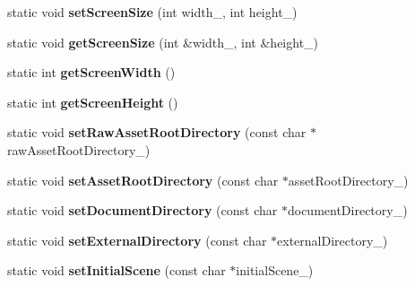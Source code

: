 \begin{DoxyCompactItemize}
\item 
static void {\bfseries set\+Screen\+Size} (int width\+\_\+, int height\+\_\+)\hypertarget{class_i_dream_sky_1_1_stage_a6f3fb27cb554c5953a91b8601d516b64}{}\label{class_i_dream_sky_1_1_stage_a6f3fb27cb554c5953a91b8601d516b64}

\item 
static void {\bfseries get\+Screen\+Size} (int \&width\+\_\+, int \&height\+\_\+)\hypertarget{class_i_dream_sky_1_1_stage_a2cbd7dc621b34f1c7f6533d6074eba48}{}\label{class_i_dream_sky_1_1_stage_a2cbd7dc621b34f1c7f6533d6074eba48}

\item 
static int {\bfseries get\+Screen\+Width} ()\hypertarget{class_i_dream_sky_1_1_stage_ab96e3421fe42fdce5bd47ac6991356dd}{}\label{class_i_dream_sky_1_1_stage_ab96e3421fe42fdce5bd47ac6991356dd}

\item 
static int {\bfseries get\+Screen\+Height} ()\hypertarget{class_i_dream_sky_1_1_stage_a9aac7165f29a617ce479d5c86c2a12e2}{}\label{class_i_dream_sky_1_1_stage_a9aac7165f29a617ce479d5c86c2a12e2}

\item 
static void {\bfseries set\+Raw\+Asset\+Root\+Directory} (const char $\ast$raw\+Asset\+Root\+Directory\+\_\+)\hypertarget{class_i_dream_sky_1_1_stage_ad4c84d4cd2faef273f538c47a5e8e3c1}{}\label{class_i_dream_sky_1_1_stage_ad4c84d4cd2faef273f538c47a5e8e3c1}

\item 
static void {\bfseries set\+Asset\+Root\+Directory} (const char $\ast$asset\+Root\+Directory\+\_\+)\hypertarget{class_i_dream_sky_1_1_stage_af861c8c9677e77b9b43e79e22e932ab4}{}\label{class_i_dream_sky_1_1_stage_af861c8c9677e77b9b43e79e22e932ab4}

\item 
static void {\bfseries set\+Document\+Directory} (const char $\ast$document\+Directory\+\_\+)\hypertarget{class_i_dream_sky_1_1_stage_a72e2a7b47165e08138c0470314f95592}{}\label{class_i_dream_sky_1_1_stage_a72e2a7b47165e08138c0470314f95592}

\item 
static void {\bfseries set\+External\+Directory} (const char $\ast$external\+Directory\+\_\+)\hypertarget{class_i_dream_sky_1_1_stage_abfe01983878916a50530e6427da5a657}{}\label{class_i_dream_sky_1_1_stage_abfe01983878916a50530e6427da5a657}

\item 
static void {\bfseries set\+Initial\+Scene} (const char $\ast$initial\+Scene\+\_\+)\hypertarget{class_i_dream_sky_1_1_stage_aaf067fd54c0c88c953f6b590a97bd75f}{}\label{class_i_dream_sky_1_1_stage_aaf067fd54c0c88c953f6b590a97bd75f}


\end{DoxyCompactItemize}
